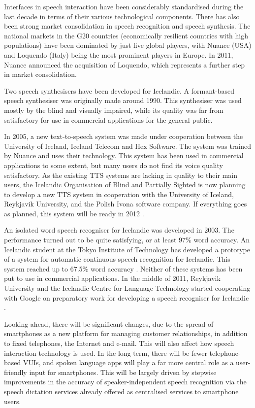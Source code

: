 \documentclass{../../metanetpaper}
\begin{document}
\begin{multicols}{2}
Interfaces in speech interaction have been considerably standardised during the last decade in terms of their various technological components. There has also been strong market consolidation in speech recognition and speech synthesis. The national markets in the G20 countries (economically resilient countries with high populations) have been dominated by just five global players, with Nuance (USA) and Loquendo (Italy) being the most prominent players in Europe. In 2011, Nuance announced the acquisition of Loquendo, which represents a further step in market consolidation.

Two speech synthesisers have been developed for Icelandic. A formant-based speech synthesiser was originally made around 1990. This synthesiser was used mostly by the blind and visually impaired, while its quality was far from satisfactory for use in commercial applications for the general public.

In 2005, a new text-to-speech system was made under cooperation between the University of Iceland, Iceland Telecom and Hex Software. The system was trained by Nuance and uses their technology. This system has been used in commercial applications to some extent, but many users do not find its voice quality satisfactory. As the existing TTS systems are lacking in quality to their main users, the Icelandic Organisation of Blind and Partially Sighted is now planning to develop a new TTS system in cooperation with the University of Iceland, Reykjavik University, and the Polish Ivona software company. If everything goes as planned, this system will be ready in 2012 \cite{tal1}. 

An isolated word speech recogniser for Icelandic was developed in 2003. The performance turned out to be quite satisfying, or at least 97\% word accuracy. An Icelandic student at the Tokyo Institute of Technology has developed a prototype of a system for automatic continuous speech recognition for Icelandic. This system reached up to 67.5\% word accuracy \cite{hind1}. Neither of these systems has been put to use in commercial applications. In the middle of 2011, Reykjavik University and the Icelandic Centre for Language Technology started cooperating with Google on preparatory work for developing a speech recogniser for Icelandic \cite{alm1}.

Looking ahead, there will be significant changes, due to the spread of smartphones as a new platform for managing customer relationships, in addition to fixed telephones, the Internet and e-mail. This will also affect how speech interaction technology is used. In the long term, there will be fewer telephone-based VUIs, and spoken language apps will play a far more central role as a user-friendly input for smartphones. This will be largely driven by stepwise improvements in the accuracy of speaker-independent speech recognition via the speech dictation services already offered as centralised services to smartphone users.


\end{multicols}
\end{document}
